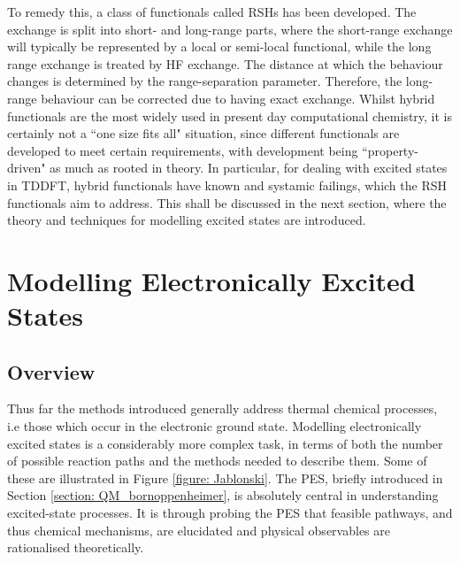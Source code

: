 To remedy this, a class of functionals called \acp{RSH} has been developed. The exchange is split into short- and long-range parts, where the short-range exchange will typically be represented by a local or semi-local functional, while the long range exchange is treated by \ac{HF} exchange. The distance at which the behaviour changes is determined by the range-separation parameter. Therefore, the long-range behaviour can be corrected due to having exact exchange. Whilst hybrid functionals are the most widely used in present day computational chemistry, it is certainly not a ``one size fits all" situation, since different functionals are developed to meet certain requirements, with development being ``property-driven" as much as rooted in theory. In particular, for dealing with excited states in \ac{TDDFT}, hybrid functionals have known and systamic failings, which the \ac{RSH} functionals aim to address. This shall be discussed in the next section, where the theory and techniques for modelling excited states are introduced.
\section{Modelling Electronically Excited States}\label{section: Photo}
\subsection{Overview}\label{section: photo_overview}
Thus far the methods introduced generally address thermal chemical processes, i.e those which occur in the electronic ground state. Modelling electronically excited states is a considerably more complex task, in terms of both the number of possible reaction paths and the methods needed to describe them. Some of these are illustrated in Figure \ref{figure: Jablonski}. The \acf{PES}, briefly introduced in Section \ref{section: QM_bornoppenheimer}, is absolutely central in understanding excited-state processes. It is through probing the \ac{PES} that feasible pathways, and thus chemical mechanisms, are elucidated and physical observables are rationalised theoretically.

